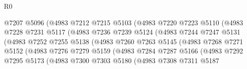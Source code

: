 \begin{lexlean}{R0}
\begin{coremodule}
                              @7207
                              @5096
                              (@4983
                                @7212
                                @7215
                                @5103
                                (@4983
                                  @7220
                                  @7223
                                  @5110
                                  (@4983
                                    @7228
                                    @7231
                                    @5117
                                    (@4983
                                      @7236
                                      @7239
                                      @5124
                                      (@4983
                                        @7244
                                        @7247
                                        @5131
                                        (@4983
                                          @7252
                                          @7255
                                          @5138
                                          (@4983
                                            @7260
                                            @7263
                                            @5145
                                            (@4983
                                              @7268
                                              @7271
                                              @5152
                                              (@4983
                                                @7276
                                                @7279
                                                @5159
                                                (@4983
                                                  @7284
                                                  @7287
                                                  @5166
                                                  (@4983
                                                    @7292
                                                    @7295
                                                    @5173
                                                    (@4983
                                                      @7300
                                                      @7303
                                                      @5180
                                                      (@4983
                                                        @7308
                                                        @7311
                                                        @5187

\end{coremodule}
\end{lexlean}
